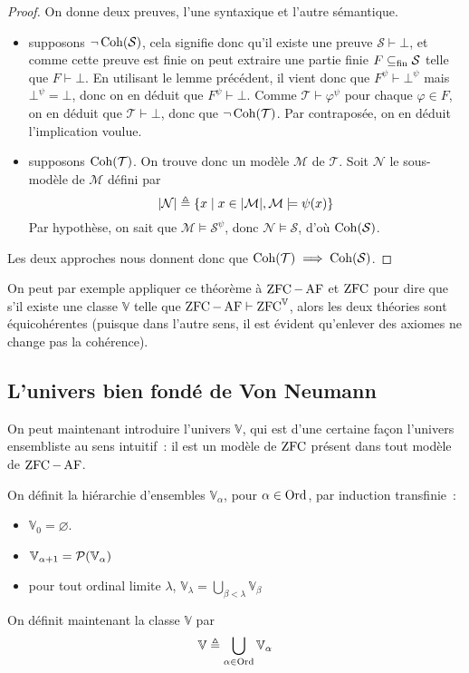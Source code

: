 \begin{proof}
  On donne deux preuves, l'une syntaxique et l'autre sémantique.
  \begin{itemize}
  \item supposons $\lnot\operatorname{Coh}(\mathcal S)$, cela signifie donc qu'il existe une
    preuve $\mathcal S\vdash \bot$, et comme cette preuve est finie on peut
    extraire une partie finie $F\subseteq_{\mathrm{fin}} \mathcal S$ telle que $F\vdash \bot$.
    En utilisant le lemme précédent, il vient donc que $F^\psi\vdash \bot^\psi$
    mais $\bot^\psi = \bot$, donc on en déduit que $F^\psi\vdash \bot$. Comme
    $\mathcal T\vdash \varphi^\psi$ pour chaque $\varphi \in F$, on en déduit
    que $\mathcal T\vdash \bot$, donc que $\lnot\operatorname{Coh}(\mathcal T)$. Par
    contraposée, on en déduit l'implication voulue.
  \item supposons $\operatorname{Coh}(\mathcal T)$. On trouve donc un modèle $\mathcal M$
    de $\mathcal T$. Soit $\mathcal N$ le sous-modèle de $\mathcal M$ défini
    par
    \[|\mathcal N|\triangleq \{x \mid x\in |\mathcal M|,
    \mathcal M\models \psi(x)\}\]
    Par hypothèse, on sait que $\mathcal M\models \mathcal S^\psi$, donc
    $\mathcal N\models \mathcal S$, d'où $\operatorname{Coh}(\mathcal S)$.
  \end{itemize}

  Les deux approches nous donnent donc que
  $\operatorname{Coh}(\mathcal T) \implies \operatorname{Coh}(\mathcal S)$.
\end{proof}

On peut par exemple appliquer ce théorème à $\operatorname{ZFC} - \operatorname{AF}$ et $\operatorname{ZFC}$ pour dire
que s'il existe une classe $\mathbb V$ telle que
$\operatorname{ZFC} - \operatorname{AF}\vdash \operatorname{ZFC}^\mathbb V$, alors les deux théories sont équicohérentes
(puisque dans l'autre sens, il est évident qu'enlever des axiomes ne change pas
la cohérence).

\subsection{L'univers bien fondé de Von Neumann}

On peut maintenant introduire l'univers $\mathbb V$, qui est d'une certaine
façon l'univers ensembliste au sens intuitif~: il est un modèle de $\operatorname{ZFC}$
présent dans tout modèle de $\operatorname{ZFC} - \operatorname{AF}$.

\begin{definition}
  On définit la hiérarchie d'ensembles $\mathbb V_{\alpha}$, pour
  $\alpha \in \operatorname{Ord}$, par induction transfinie~:
  \begin{itemize}
  \item $\mathbb V_0 = \varnothing$.
  \item $\mathbb V_{\alpha + 1} = \mathcal{P}(\mathbb V_{\alpha})$
  \item pour tout ordinal limite $\lambda$,
    $\displaystyle\mathbb V_\lambda = \bigcup_{\beta < \lambda}\mathbb V_\beta$
  \end{itemize}

  On définit maintenant la classe $\mathbb V$ par
  \[\mathbb V \triangleq \bigcup_{\alpha \in \operatorname{Ord}} \mathbb V_\alpha\]
\end{definition}

